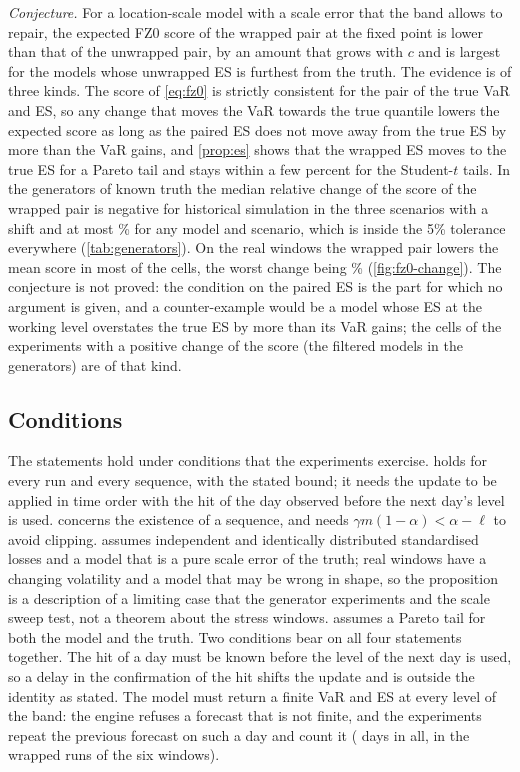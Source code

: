 \emph{Conjecture.} For a location-scale model with a scale error that the band allows to repair, the expected FZ0 score of the wrapped pair at the fixed point is lower than that of the unwrapped pair, by an amount that grows with $c$ and is largest for the models whose unwrapped ES is furthest from the truth. The evidence is of three kinds. The score of \cref{eq:fz0} is strictly consistent for the pair of the true VaR and ES, so any change that moves the VaR towards the true quantile lowers the expected score as long as the paired ES does not move away from the true ES by more than the VaR gains, and \cref{prop:es} shows that the wrapped ES moves to the true ES for a Pareto tail and stays within a few percent for the Student-$t$ tails. In the generators of known truth the median relative change of the score of the wrapped pair is negative for historical simulation in the three scenarios with a shift and at most \genFzPosMax\% for any model and scenario, which is inside the 5\% tolerance everywhere (\cref{tab:generators}). On the real windows the wrapped pair lowers the mean score in most of the cells, the worst change being \tenWorstFz\% (\cref{fig:fz0-change}). The conjecture is not proved: the condition on the paired ES is the part for which no argument is given, and a counter-example would be a model whose ES at the working level overstates the true ES by more than its VaR gains; the cells of the experiments with a positive change of the score (the filtered models in the generators) are of that kind.

\subsection{Conditions}
\label{sec:theory-conditions}

The statements hold under conditions that the experiments exercise.  holds for every run and every sequence, with the stated bound; it needs the update to be applied in time order with the hit of the day observed before the next day's level is used.  concerns the existence of a sequence, and needs $\gamma m(1-\alpha) < \alpha - \ell$ to avoid clipping.  assumes independent and identically distributed standardised losses and a model that is a pure scale error of the truth; real windows have a changing volatility and a model that may be wrong in shape, so the proposition is a description of a limiting case that the generator experiments and the scale sweep test, not a theorem about the stress windows.  assumes a Pareto tail for both the model and the truth. Two conditions bear on all four statements together. The hit of a day must be known before the level of the next day is used, so a delay in the confirmation of the hit shifts the update and is outside the identity as stated. The model must return a finite VaR and ES at every level of the band: the engine refuses a forecast that is not finite, and the experiments repeat the previous forecast on such a day and count it (\tenFallback{} days in all, in the \tenIndRunsAll{} wrapped runs of the six windows).
